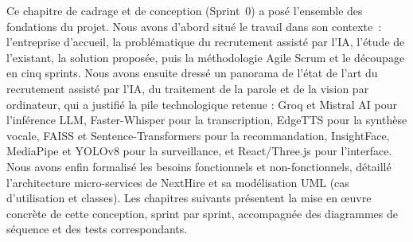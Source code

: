 Ce chapitre de cadrage et de conception (Sprint~0) a posé l'ensemble des fondations du projet. Nous avons d'abord situé le travail dans son contexte~: l'entreprise d'accueil, la problématique du recrutement assisté par l'IA, l'étude de l'existant, la solution proposée, puis la méthodologie Agile Scrum et le découpage en cinq sprints. Nous avons ensuite dressé un panorama de l'état de l'art du recrutement assisté par l'IA, du traitement de la parole et de la vision par ordinateur, qui a justifié la pile technologique retenue : Groq et Mistral AI pour l'inférence LLM, Faster-Whisper pour la transcription, EdgeTTS pour la synthèse vocale, FAISS et Sentence-Transformers pour la recommandation, InsightFace, MediaPipe et YOLOv8 pour la surveillance, et React/Three.js pour l'interface. Nous avons enfin formalisé les besoins fonctionnels et non-fonctionnels, détaillé l'architecture micro-services de NextHire et sa modélisation UML (cas d'utilisation et classes). Les chapitres suivants présentent la mise en œuvre concrète de cette conception, sprint par sprint, accompagnée des diagrammes de séquence et des tests correspondants.
